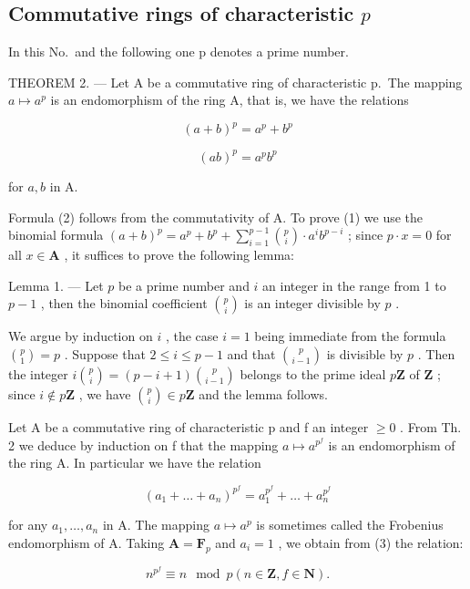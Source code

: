 \subsection{\texorpdfstring{Commutative rings of characteristic \(p\)}{Commutative rings of characteristic p}}

In this No.~and the following one p denotes a prime number.

THEOREM 2. --- Let A be a commutative ring of characteristic p.~The mapping \(a \mapsto a^{p}\) is an endomorphism of the ring A, that is, we have the relations

\[
(a + b) ^ {p} = a ^ {p} + b ^ {p}\tag{1}
\]

\[
(a b) ^ {p} = a ^ {p} b ^ {p}\tag{2}
\]

for \(a, b\) in A.

Formula (2) follows from the commutativity of A. To prove (1) we use the binomial formula \((a + b)^p = a^p + b^p + \sum_{i=1}^{p-1} \binom{p}{i} \cdot a^ib^{p-i}\) ; since \(p \cdot x = 0\) for all \(x \in \mathbf{A}\) , it suffices to prove the following lemma:

Lemma 1. --- Let \(p\) be a prime number and \(i\) an integer in the range from 1 to \(p - 1\) , then the binomial coefficient \(\binom{p}{i}\) is an integer divisible by \(p\) .

We argue by induction on \(i\) , the case \(i = 1\) being immediate from the formula \(\binom{p}{1} = p\) . Suppose that \(2 \leqslant i \leqslant p - 1\) and that \(\binom{p}{i - 1}\) is divisible by \(p\) . Then the integer \(i\binom{p}{i} = (p - i + 1)\binom{p}{i - 1}\) belongs to the prime ideal \(p\mathbf{Z}\) of \(\mathbf{Z}\) ; since \(i \notin p\mathbf{Z}\) , we have \(\binom{p}{i} \in p\mathbf{Z}\) and the lemma follows.

Let A be a commutative ring of characteristic p and f an integer \(\geqslant0\) . From Th. 2 we deduce by induction on f that the mapping \(a\mapsto a^{p^{f}}\) is an endomorphism of the ring A. In particular we have the relation

\[
(a _ {1} + \dots + a _ {n}) ^ {p ^ {f}} = a _ {1} ^ {p ^ {f}} + \dots + a _ {n} ^ {p ^ {f}}\tag{3}
\]

for any \(a_{1},\ldots,a_{n}\) in A. The mapping \(a\mapsto a^{p}\) is sometimes called the Frobenius endomorphism of A. Taking \(\mathbf{A}=\mathbf{F}_{p}\) and \(a_{i}=1\) , we obtain from (3) the relation:

\[
n ^ {p ^ {f}} \equiv n \mod p (n \in \mathbf {Z}, f \in \mathbf {N}).\tag{4}
\]

